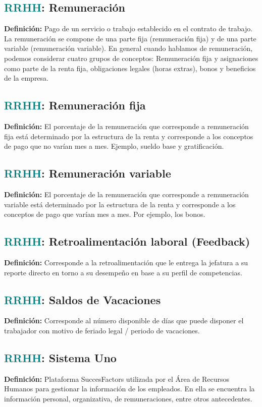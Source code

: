 \documentclass[12pt]{article}
\begin{document}
\subsection{\textcolor{teal}{RRHH}: Remuneración}
\textbf{Definición:} Pago de un servicio o trabajo establecido en el contrato de trabajo. La remuneración se compone de una parte fija (remuneración fija) y de una parte variable (remuneración variable). En general cuando hablamos de remuneración, podemos considerar cuatro grupos de conceptos:
Remuneración fija y asignaciones como parte de la renta fija, obligaciones legales (horas extras), bonos y beneficios de la empresa.
\subsection{\textcolor{teal}{RRHH}: Remuneración fija}
\textbf{Definición:} El porcentaje de la remuneración que corresponde a remuneración fija está determinado por la estructura de la renta y corresponde a los conceptos de pago que no varían mes a mes. Ejemplo, sueldo base y gratificación.
\subsection{\textcolor{teal}{RRHH}: Remuneración variable}
\textbf{Definición:} El porcentaje de la remuneración que corresponde a remuneración variable está determinado por la estructura de la renta y corresponde a los conceptos de pago que varían mes a mes. Por ejemplo, los bonos.
\subsection{\textcolor{teal}{RRHH}: Retroalimentación laboral (Feedback)}
\textbf{Definición:} Corresponde a la retroalimentación que le entrega la jefatura a su reporte directo en torno a su desempeño en base a su perfil de competencias.
\subsection{\textcolor{teal}{RRHH}: Saldos de Vacaciones}
\textbf{Definición:} Corresponde al número disponible de días que puede disponer el trabajador con motivo de feriado legal / periodo de vacaciones.
\subsection{\textcolor{teal}{RRHH}: Sistema Uno}
\textbf{Definición:} Plataforma SuccesFactors utilizada por el Área de Recursos Humanos para gestionar la información de los empleados. En ella se encuentra la información personal, organizativa, de remuneraciones, entre otros antecedentes.
\end{document}
